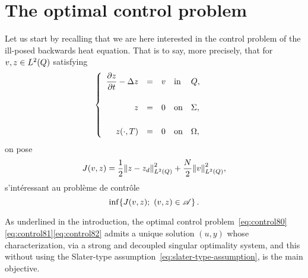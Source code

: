 \section{The optimal control problem}\label{sec:controlproblem}

Let us start by recalling that we are here interested in the control
problem of the ill-posed backwards heat equation. That is to say, more
precisely, that for $v,z\in L^{2}\!\left({Q}\right)$ satisfying
\begin{equation}\label{eq:control80}
    \begin{cases}\displaystyle
        \begin{array}{rclll}
            \dfrac{\partial{}z}{\partial{}t} - \Delta z & = & v & \text{in} & Q,\\
            \\
            z & = & 0 & \text{on} & \Sigma,\\
            \\
            {z}\!\left({\cdot,T}\right) & = & 0 & \text{on} & \Omega,
        \end{array}
    \end{cases}
\end{equation}
on pose
\begin{equation}\label{eq:control81}
    J(v,z) = \dfrac{1}{2}{\left\|{z - z_{d} }\right\|}_{L^{2}\left({Q}\right)}^{2} + \dfrac{N}{2}{\left\|{v }\right\|}_{L^{2}\left({Q}\right)}^{2},
\end{equation}
s'intéressant au problème de contrôle
\begin{equation}\label{eq:control82}
    \inf\!\left\{{%
        J(v,z);\ (v,z)\in\Ascr
    }\right\}.
\end{equation}

As underlined in the introduction, the optimal control
problem~\eqref{eq:control80}\eqref{eq:control81}\eqref{eq:control82} admits
a unique solution $(u,y)$ whose characterization, via a strong and
decoupled singular optimality system, and this without using the
Slater-type assumption~\eqref{eq:slater-type-assumption}, is the main
objective.

